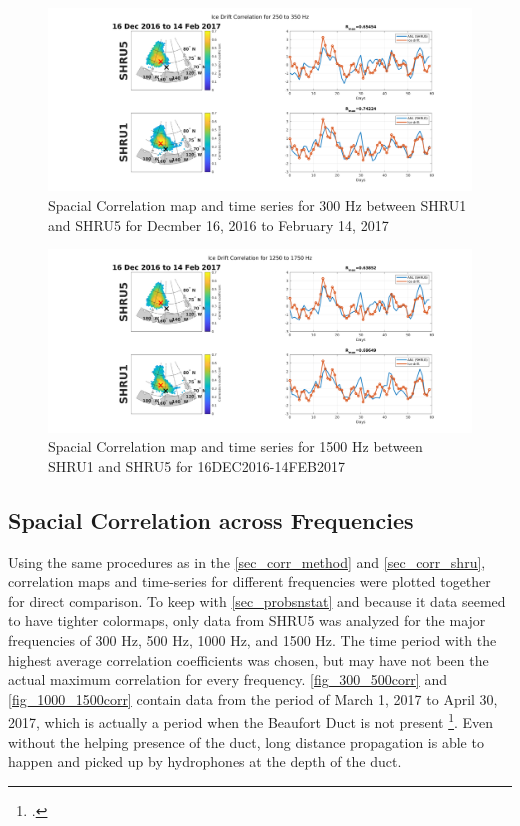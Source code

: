 \begin{figure}[p]
\centering
\includegraphics[scale=0.35]{Figures/spatial_corr_20161216-20170214_250_350.png}
\caption{Spacial Correlation map and time series for 300 Hz between SHRU1 and SHRU5 for Decmber 16, 2016 to February 14, 2017}
\label{fig_300_16DEC}
\end{figure}

\begin{figure}[p]
\centering
\includegraphics[scale=0.35]{Figures/spatial_corr_20161216-20170214_1250_1750.png}
\caption{Spacial Correlation map and time series for 1500 Hz between SHRU1 and SHRU5 for 16DEC2016-14FEB2017}
\label{fig_1500_16DEC}
\end{figure}

\subsection{Spacial Correlation across Frequencies} \label{sec_spa_corr_freqs}

Using the same procedures as in the \autoref{sec_corr_method} and \autoref{sec_corr_shru}, correlation maps and time-series for different frequencies were plotted together for direct comparison. To keep with \autoref{sec_probsnstat} and because it data seemed to have tighter colormaps, only data from SHRU5 was analyzed for the major frequencies of 300 Hz, 500 Hz, 1000 Hz, and 1500 Hz. The time period with the highest average correlation coefficients was chosen, but may have not been the actual maximum correlation for every frequency. \autoref{fig_300_500corr} and \autoref{fig_1000_1500corr} contain data from the period of March 1, 2017 to April 30, 2017, which is actually a period when the Beaufort Duct is not present \footcite[]{ballard2020yearlong}. Even without the helping presence of the duct, long distance propagation is able to happen and picked up by hydrophones at the depth of the duct.

